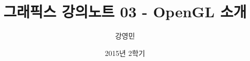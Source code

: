 \documentclass{beamer}
\title[3D 그래픽스 프로그래밍]{그래픽스 강의노트 03 - OpenGL 소개}
\author{강영민}
\institute{동명대학교}
\date{2015년 2학기}
\begin{document}
\begin{frame}
  \titlepage
\end{frame}




%
\end{document}
